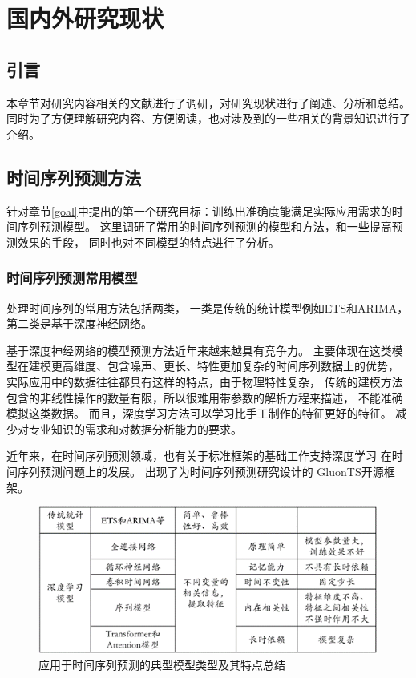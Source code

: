 
\chapter{国内外研究现状}\label{chapter2}
\section{引言}
本章节对研究内容相关的文献进行了调研，对研究现状进行了阐述、分析和总结。
同时为了方便理解研究内容、方便阅读，也对涉及到的一些相关的背景知识进行了介绍。
\section{时间序列预测方法}
  针对章节\ref{goal}中提出的第一个研究目标：训练出准确度能满足实际应用需求的时间序列预测模型。
  这里调研了常用的时间序列预测的模型和方法，和一些提高预测效果的手段，
  同时也对不同模型的特点进行了分析。
\subsection{时间序列预测常用模型}

  处理时间序列的常用方法包括两类，
  一类是传统的统计模型例如ETS和ARIMA，第二类是基于深度神经网络。

  基于深度神经网络的模型预测方法近年来越来越具有竞争力。
  主要体现在这类模型在建模更高维度、包含噪声、更长、特性更加复杂的时间序列数据上的优势，
  实际应用中的数据往往都具有这样的特点，由于物理特性复杂，
  传统的建模方法包含的非线性操作的数量有限，所以很难用带参数的解析方程来描述，
  不能准确模拟这类数据。
  而且，深度学习方法可以学习比手工制作的特征更好的特征。
  减少对专业知识的需求和对数据分析能力的要求。

  近年来，在时间序列预测领域，也有关于标准框架的基础工作支持深度学习
  在时间序列预测问题上的发展。
  出现了为时间序列预测研究设计的
  GluonTS开源框架\cite{DBLP:journals/corr/abs-1906-05264}。

  \begin{figure}
    \centering
    \includegraphics[width=\linewidth]{figures/预测典型模型.png}
    \caption{应用于时间序列预测的典型模型类型及其特点总结}
    \label{tab:prediction models}
  \end{figure}

